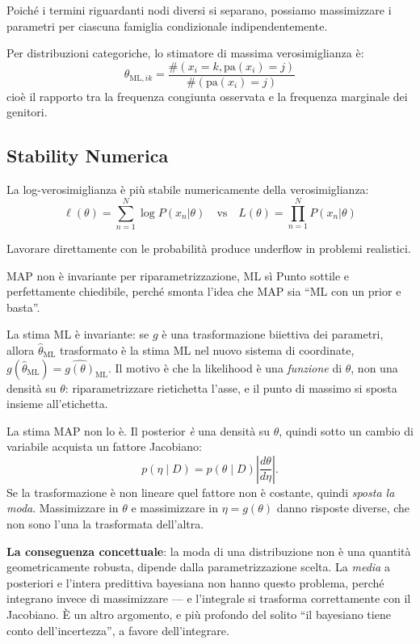 Poiché i termini riguardanti nodi diversi si separano, possiamo massimizzare i parametri per ciascuna famiglia condizionale indipendentemente.

\begin{theorem}
  Per distribuzioni categoriche, lo stimatore di massima verosimiglianza è:
  \[\theta_{\text{ML},ik} = \frac{\#(x_i = k, \text{pa}(x_i) = j)}{\#(\text{pa}(x_i) = j)}\]
  cioè il rapporto tra la frequenza congiunta osservata e la frequenza marginale dei genitori.
\end{theorem}

\subsection{Stability Numerica}

La log-verosimiglianza è più stabile numericamente della verosimiglianza:
\[\ell(\theta) = \sum_{n=1}^N \log P(x_n|\theta) \quad \text{vs} \quad L(\theta) = \prod_{n=1}^N P(x_n|\theta)\]

Lavorare direttamente con le probabilità produce underflow in problemi realistici.

\begin{trappola}{MAP non è invariante per riparametrizzazione, ML sì}
Punto sottile e perfettamente chiedibile, perché smonta l'idea che MAP sia ``ML con un prior e basta''.

La stima ML è invariante: se $g$ è una trasformazione biiettiva dei parametri, allora $\hat\theta_{\text{ML}}$ trasformato è la stima ML nel nuovo sistema di coordinate, $g(\hat\theta_{\text{ML}}) = \widehat{g(\theta)}_{\text{ML}}$. Il motivo è che la likelihood è una \emph{funzione} di $\theta$, non una densità su $\theta$: riparametrizzare rietichetta l'asse, e il punto di massimo si sposta insieme all'etichetta.

La stima MAP non lo è. Il posterior \emph{è} una densità su $\theta$, quindi sotto un cambio di variabile acquista un fattore Jacobiano:
\[
p(\eta \mid D) = p(\theta \mid D)\left|\frac{d\theta}{d\eta}\right|.
\]
Se la trasformazione è non lineare quel fattore non è costante, quindi \emph{sposta la moda}. Massimizzare in $\theta$ e massimizzare in $\eta = g(\theta)$ danno risposte diverse, che non sono l'una la trasformata dell'altra.

\textbf{La conseguenza concettuale}: la moda di una distribuzione non è una quantità geometricamente robusta, dipende dalla parametrizzazione scelta. La \emph{media} a posteriori e l'intera predittiva bayesiana non hanno questo problema, perché integrano invece di massimizzare — e l'integrale si trasforma correttamente con il Jacobiano. È un altro argomento, e più profondo del solito ``il bayesiano tiene conto dell'incertezza'', a favore dell'integrare.
\end{trappola}

